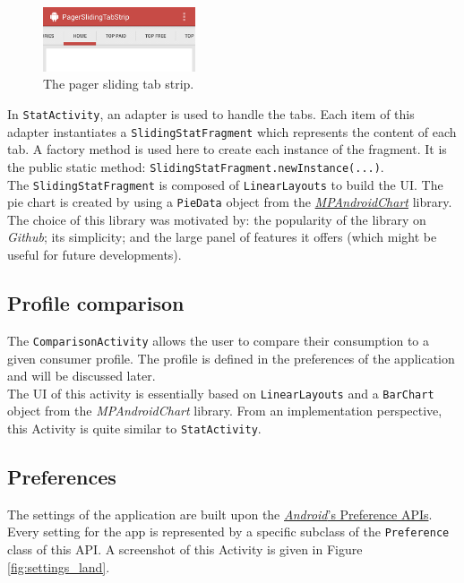 \documentclass[a4paper, oneside, 11pt]{book}
\begin{document}
\begin{figure}[htbp]
	\centerline{\includegraphics[width=0.4\textwidth]{pager.png}}
	\caption{The pager sliding tab strip.}
	\label{fig:pager}
\end{figure}

In \texttt{StatActivity}, an adapter is used to handle the tabs. Each item of this adapter instantiates a \texttt{SlidingStatFragment} which represents the content of each tab. A factory method is used here to create each instance of the fragment. It is the public static method: \texttt{SlidingStatFragment.newInstance(...)}.\\

The \texttt{SlidingStatFragment} is composed of \texttt{LinearLayouts} to build the UI. The pie chart is created by using a \texttt{PieData} object from the \href{https://github.com/PhilJay/MPAndroidChart}{\textit{MPAndroidChart}} library. The choice of this library was motivated by: the popularity of the library on \textit{Github}; its simplicity; and the large panel of features it offers (which might be useful for future developments).

\subsection{Profile comparison}
The \texttt{ComparisonActivity} allows the user to compare their consumption to a given consumer profile. The profile is defined in the preferences of the application and will be discussed later.\\

The UI of this activity is essentially based on \texttt{LinearLayouts} and a \texttt{BarChart} object from the \textit{MPAndroidChart} library. From an implementation perspective, this Activity is quite similar to \texttt{StatActivity}.

\subsection{Preferences}
The settings of the application are built upon the \href{https://developer.android.com/guide/topics/ui/settings.html}{\textit{Android}'s Preference APIs}. Every setting for the app is represented by a specific subclass of the \texttt{Preference} class of this API. A screenshot of this Activity is given in Figure \ref{fig:settings_land}. \\
\end{document}
